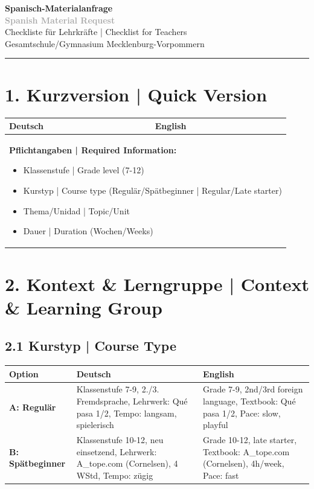 \documentclass[11pt,a4paper]{article}
\begin{document}
\begin{center}
{\Huge\textcolor{spanisch}{\textbf{Spanisch-Materialanfrage}}}\\[0.3cm]
{\Huge\textcolor{darkgray}{\textbf{Spanish Material Request}}}\\[0.8cm]
{\Large Checkliste für Lehrkräfte | Checklist for Teachers}\\[0.3cm]
{\large Gesamtschule/Gymnasium Mecklenburg-Vorpommern}\\[0.5cm]
\textcolor{spanisch}{\rule{0.6\textwidth}{2pt}}
\end{center}

\vspace{0.5cm}

\section*{\textcolor{spanisch}{1. Kurzversion | Quick Version}}

\begin{tabularx}{\textwidth}{|X|X|}
\hline
\rowcolor{lightgray}
\textbf{Deutsch} & \textbf{English} \\
\hline
\multicolumn{2}{|p{0.97\textwidth}|}{
\textbf{Pflichtangaben | Required Information:}
\begin{itemize}[leftmargin=*, nosep]
    \item Klassenstufe | Grade level (7-12)
    \item Kurstyp | Course type (Regulär/Spätbeginner | Regular/Late starter)
    \item Thema/Unidad | Topic/Unit
    \item Dauer | Duration (Wochen/Weeks)
\end{itemize}
} \\
\hline
\end{tabularx}

\vspace{0.5cm}

\section*{\textcolor{spanisch}{2. Kontext \& Lerngruppe | Context \& Learning Group}}

\subsection*{2.1 Kurstyp | Course Type}

\begin{tabularx}{\textwidth}{|l|X|X|}
\hline
\rowcolor{lightgray}
\textbf{Option} & \textbf{Deutsch} & \textbf{English} \\
\hline
\textbf{A: Regulär} &
Klassenstufe 7-9, 2./3. Fremdsprache, Lehrwerk: Qué pasa 1/2, Tempo: langsam, spielerisch &
Grade 7-9, 2nd/3rd foreign language, Textbook: Qué pasa 1/2, Pace: slow, playful \\
\hline
\textbf{B: Spätbeginner} &
Klassenstufe 10-12, neu einsetzend, Lehrwerk: A\_tope.com (Cornelsen), 4 WStd, Tempo: zügig &
Grade 10-12, late starter, Textbook: A\_tope.com (Cornelsen), 4h/week, Pace: fast \\
\hline
\end{tabularx}
\end{document}
